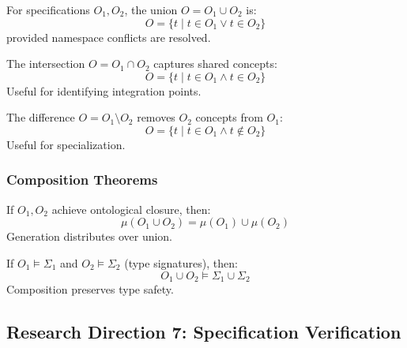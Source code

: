 \begin{definition}
    For specifications $O_1, O_2$, the union $O = O_1 \cup O_2$ is:
    \begin{equation}
        O = \{t \mid t \in O_1 \lor t \in O_2\}
    \end{equation}
    provided namespace conflicts are resolved.
\end{definition}

\begin{definition}
    The intersection $O = O_1 \cap O_2$ captures shared concepts:
    \begin{equation}
        O = \{t \mid t \in O_1 \land t \in O_2\}
    \end{equation}
    Useful for identifying integration points.
\end{definition}

\begin{definition}
    The difference $O = O_1 \setminus O_2$ removes $O_2$ concepts from $O_1$:
    \begin{equation}
        O = \{t \mid t \in O_1 \land t \notin O_2\}
    \end{equation}
    Useful for specialization.
\end{definition}

\subsubsection{Composition Theorems}

\begin{theorem}
    If $O_1, O_2$ achieve ontological closure, then:
    \begin{equation}
        \mu(O_1 \cup O_2) = \mu(O_1) \cup \mu(O_2)
    \end{equation}
    Generation distributes over union.
\end{theorem}

\begin{theorem}
    If $O_1 \models \Sigma_1$ and $O_2 \models \Sigma_2$ (type signatures), then:
    \begin{equation}
        O_1 \cup O_2 \models \Sigma_1 \cup \Sigma_2
    \end{equation}
    Composition preserves type safety.
\end{theorem}

\subsection{Research Direction 7: Specification Verification}

